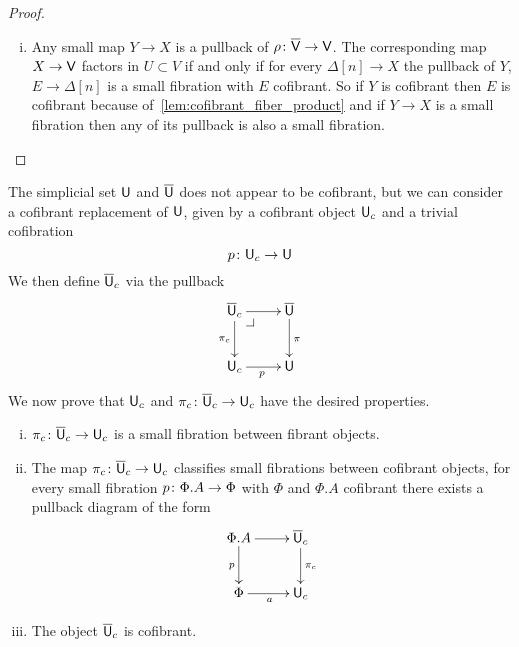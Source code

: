 \documentclass[reqno,10pt,a4paper,oneside,draft]{amsart}
\begin{document}
\begin{proof}
\begin{enumerate}[(i)]
\item Any small map $Y \rightarrow X$ is a pullback of $\rho \colon \overline{\mathsf{V}} \rightarrow \mathsf{V}$. The corresponding map $X \rightarrow \mathsf{V}$ factors in $U \subset V$ if and only if for every $\Delta[n] \rightarrow X$ the pullback of $Y$, $E \rightarrow \Delta[n]$ is a small fibration with $E$ cofibrant. So if $Y$ is cofibrant then $E$ is cofibrant because of~\cref{lem:cofibrant_fiber_product} and if $Y \rightarrow X$ is a small fibration then any of its pullback is also a small fibration.  \qedhere
\end{enumerate}
\end{proof} 



The simplicial set $\mathsf{U}$ and $\overline{\mathsf{U}}$ does not appear to be cofibrant, but we can consider a cofibrant replacement of $\mathsf{U}$, given by a cofibrant object $\mathsf{U}_c$ and a trivial cofibration
\begin{equation}
\label{equ:ucu}
p \colon \mathsf{U}_c \rightarrow \mathsf{U}
\end{equation}
We then define $\overline{\mathsf{U}}_c$ via the pullback
\[
\xymatrix{
\UU_c \ar[d]_{\pi_c} \ar[r] \drpullback & \UU \ar[d]^{\pi}  \\
\U_c \ar[r]_p & \U}
\]
We now prove that $\mathsf{U}_c$ and $\pi_c \colon \overline{\mathsf{U}}_c \to \mathsf{U}_c$ have the desired properties.


\begin{proposition} \label{thm:universe-uc} 
\hfill 
\begin{enumerate}[(i)] 
\item $\pi_c \colon \overline{\mathsf{U}}_c \to \mathsf{U}_c$ is a small fibration between fibrant objects. 
\item The map $\pi_c \colon \overline{\mathsf{U}}_c \to \mathsf{U}_c$ classifies small fibrations between cofibrant objects, \ie 
for every small fibration $p \colon \Phi.A \to \Phi$ with $\Phi$ and $\Phi.A$ cofibrant there exists a pullback diagram of the form
\[
\xymatrix{
\Phi.A \ar[r] \ar[d]_p & \UU_c \ar[d]^{\pi_c} \\
\Phi \ar[r]_a & \U_c }
\]
\item The object $\overline{\mathsf{U}}_c$ is cofibrant. 
\end{enumerate}
\end{proposition}
\end{document}
